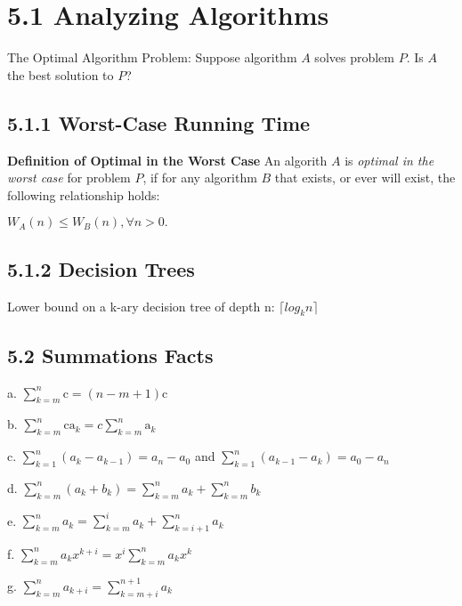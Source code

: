 \documentclass[10pt,twocolumn]{article}
\newenvironment{packed_list}{
\begin{itemize}
  \setlength{\itemsep}{1pt}
  \setlength{\parskip}{0pt}
  \setlength{\parsep}{0pt}
}{\end{itemize}}
\begin{document}
	\section*{5.1 Analyzing Algorithms}
	
	The Optimal Algorithm Problem: Suppose algorithm $A$ solves
        problem $P$. Is $A$ the best solution to $P$?
	
	\subsection*{5.1.1 Worst-Case Running Time}
	
	\textbf{Definition of Optimal in the Worst Case} An algorith
        $A$ is \emph{optimal in the worst case} for problem $P$, if
        for any algorithm $B$ that exists, or ever will exist, the
        following relationship holds:
	\begin{center}$W_A(n)\leq W_B(n),\forall n>0.$\end{center}
	
	\subsection*{5.1.2 Decision Trees}
	
	Lower bound on a k-ary decision tree of depth n: $\lceil log_k n\rceil$
	
	\subsection*{5.2 Summations Facts}
        \begin{packed_list}
	\item[a.] $ \sum_{k=m}^n \mathrm{c} = (n - m + 1)\mathrm{c}$ 
	\item[b.] $ \sum_{k=m}^n \mathrm{c a_\mathit{k}} = c
	\sum_{k=m}^n \mathrm{a_\mathit{k}}$
	\item[c.] $\sum_{k=1}^n (a_\mathit{k} - a_\mathit{k - 1}) =
	a_\mathit{n} - a_\mathit{0}$ 
		and $ \sum_{k=1}^n
	(a_\mathit{k - 1} - a_\mathit{k}) = a_\mathit{0} - a_\mathit{n}$
	\item[d.] $\sum_{k=m}^n (a_\mathit{k} + b_\mathit{k}) =
	\sum_{k=m}^n a_\mathit{k} + \sum_{k=m}^n
	b_\mathit{k}$
	\item[e.] $\sum_{k=m}^n a_\mathit{k} = \sum_{k=m}^i
	a_\mathit{k} +  \sum_{k=i+1}^n a_\mathit{k}$
	\item[f.] $\sum_{k=m}^n a_\mathit{k}x^\mathit{k+i} = 
	x^\mathit{i} \sum_{k=m}^n a_\mathit{k}x^\mathit{k}$
	\item[g.] $\sum_{k=m}^n a_\mathit{k+i} = \sum_{k=m+i}^{n+1}
	a_\mathit{k}$
        \end{packed_list}
\end{document}
